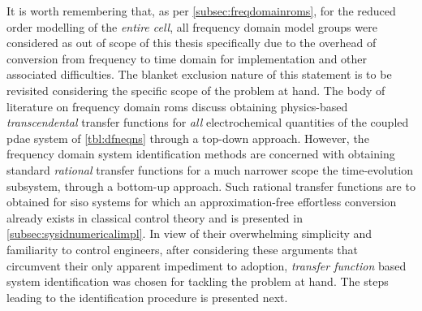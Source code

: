 It  is  worth remembering  that,  as  per \cref{subsec:freqdomainroms}, for  the
reduced order  modelling of the  \emph{entire cell}, all frequency  domain model
groups were considered  as out of scope  of this thesis specifically  due to the
overhead  of conversion  from frequency  to time  domain for  implementation and
other associated difficulties. The blanket exclusion nature of this statement is
to be revisited considering the specific scope  of the problem at hand. The body
of literature  on frequency  domain \glspl{rom} discuss  obtaining physics-based
\emph{transcendental}   transfer   functions  for   \emph{all}   electrochemical
quantities  of the  coupled  \gls{pdae} system  of \cref{tbl:dfneqns} through  a
top-down approach.  However, the frequency domain  system identification methods
are concerned with  obtaining standard \emph{rational} transfer  functions for a
much narrower  scope \viz{}  the time-evolution  subsystem, through  a bottom-up
approach.  Such  rational transfer  functions  are  to obtained  for  \gls{siso}
systems for which an approximation-free  effortless conversion already exists in
classical control  theory and is  presented in \cref{subsec:sysidnumericalimpl}.
In view of  their overwhelming simplicity and familiarity  to control engineers,
after considering these arguments that circumvent their only apparent impediment
to adoption, \emph{transfer function} based system identification was chosen for
tackling the problem at hand. The  steps leading to the identification procedure
is presented next.



